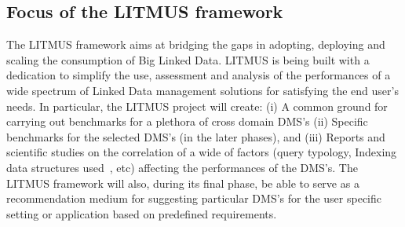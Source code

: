 \documentclass{llncs}
\begin{document}
    \subsection{Focus of the LITMUS framework}
    The LITMUS framework aims at bridging the gaps in adopting, deploying and scaling the consumption of Big Linked Data. LITMUS is being built with a dedication to simplify the use, assessment and analysis of the performances of a wide spectrum of Linked Data management solutions for satisfying the end user's needs.  In particular, the LITMUS project will create: (i) A common ground for carrying out benchmarks for a plethora of cross domain DMS's (ii) Specific benchmarks for the selected DMS's (in the later phases), and  (iii) Reports and scientific studies on the correlation of a wide of factors (query typology, Indexing data structures used~\cite{shekarpour2016question}, etc) affecting the performances of the DMS's. The LITMUS framework will also, during its final phase, be able to serve as a recommendation medium for suggesting particular DMS's for the user specific setting or application based on predefined requirements. 
    
\end{document}
